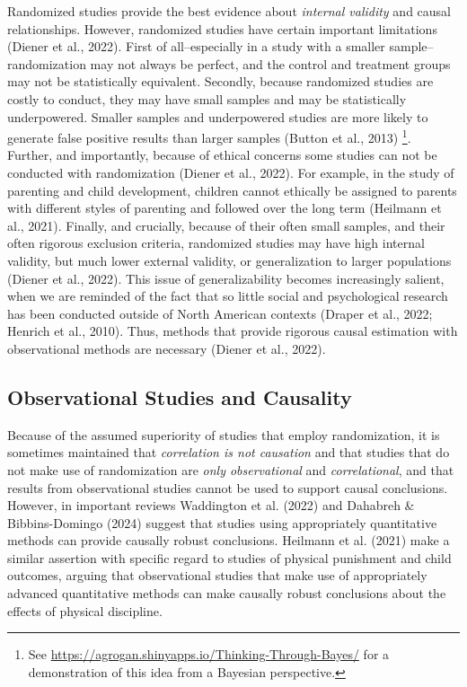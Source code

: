 \documentclass[
  letterpaper,
  DIV=11,
  numbers=noendperiod]{scrreprt}
\begin{document}
Randomized studies provide the best evidence about \emph{internal
validity} and causal relationships. 
However, randomized studies have certain important limitations (Diener
et al., 2022). First of all--especially in a study with a smaller
sample--randomization may not always be perfect, and the control and
treatment groups may not be statistically equivalent. Secondly, because
randomized studies are costly to conduct, they may have small samples
and may be statistically underpowered. Smaller samples and underpowered
studies are more likely to generate false positive results than larger
samples (Button et al., 2013) \footnote{See
  \url{https://agrogan.shinyapps.io/Thinking-Through-Bayes/} for a
  demonstration of this idea from a Bayesian perspective.}. Further, and
importantly, because of ethical concerns some studies can not be
conducted with randomization (Diener et al., 2022). For example, in the
study of parenting and child development, children cannot ethically be
assigned to parents with different styles of parenting and followed over
the long term (Heilmann et al., 2021). Finally, and crucially, because
of their often small samples, and their often rigorous exclusion
criteria, randomized studies may have high internal validity, but much
lower external validity, or generalization to larger populations (Diener
et al., 2022). This issue of generalizability becomes increasingly
salient, when we are reminded of the fact that so little social and
psychological research has been conducted outside of North American
contexts (Draper et al., 2022; Henrich et al., 2010). Thus, methods that
provide rigorous causal estimation with observational methods are
necessary (Diener et al., 2022).

\subsection{Observational Studies and
Causality}\label{observational-studies-and-causality}

Because of the assumed superiority of studies that employ randomization,
it is sometimes maintained that \emph{correlation is not causation} and
that studies that do not make use of randomization are \emph{only
observational} and \emph{correlational}, and that results from
observational studies cannot be used to support causal conclusions.
 However, in important
reviews Waddington et al. (2022) and Dahabreh \& Bibbins-Domingo (2024)
suggest that studies using appropriately quantitative methods can
provide causally robust conclusions. Heilmann et al. (2021) make a
similar assertion with specific regard to studies of physical punishment
and child outcomes, arguing that observational studies that make use of
appropriately advanced quantitative methods can make causally robust
conclusions about the effects of physical discipline.
\end{document}
